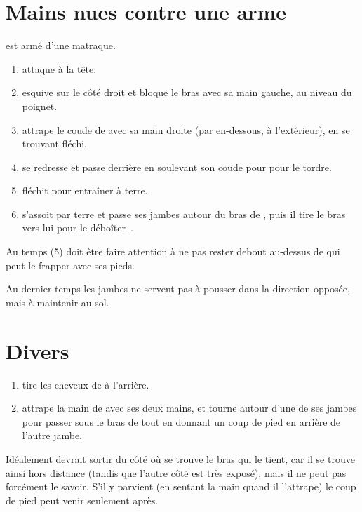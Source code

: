 \section{Mains nues contre une arme}


\begin{technique}

\A est armé d'une matraque.

\begin{enumerate}
	\item \A attaque \D à la tête.
	
	\item \D esquive sur le côté droit et bloque le bras avec sa main gauche, au niveau du poignet.
	
	\item \D attrape le coude de \A avec sa main droite (par en-dessous, à l'extérieur), en se trouvant fléchi.
	
	\item \D se redresse et passe derrière \A en soulevant son coude pour pour le tordre.
	
	\item \D fléchit pour entraîner \A à terre.
	
	\item \D s'assoit par terre et passe ses jambes autour du bras de \A, puis il tire le bras vers lui pour le déboîter~\footnotemark.
\end{enumerate}

Au temps (5) \D doit être faire attention à ne pas rester debout au-dessus de \A qui peut le frapper avec ses pieds.

Au dernier temps les jambes ne servent pas à pousser dans la direction opposée, mais à maintenir \A au sol.

\end{technique}


\section{Divers}


\begin{technique}

\begin{enumerate}
	\item \A tire les cheveux de \D à l'arrière.
	
	\item \D attrape la main de \A avec ses deux mains, et tourne autour d'une de ses jambes pour passer sous le bras de \A tout en donnant un coup de pied en arrière de l'autre jambe.
\end{enumerate}

Idéalement \D devrait sortir du côté où se trouve le bras qui le tient, car il se trouve ainsi hors distance (tandis que l'autre côté est très exposé), mais il ne peut pas forcément le savoir.
S'il y parvient (en sentant la main quand il l'attrape) le coup de pied peut venir seulement après.

\end{technique}



